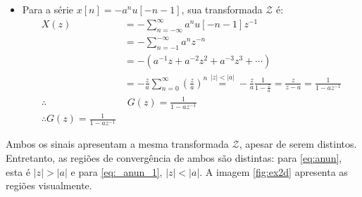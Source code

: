 \begin{enumerate}
\begin{itemize}
                \item Para a série $x[n] = -a^n u[-n-1]$, sua transformada $\mathcal{Z}$ é:
                    \begin{equation}
                        \begin{split}
                            X(z) &= - \sum_{n = - \infty}^{\infty} a^n u[-n - 1] z^{-1} \\
                            &= - \sum_{n = -1}^{-\infty} a^n z^{-n} \\
                            &= -\left(a^{-1}z + a^{-2} z^2 + a^{-3} z^3 + \cdots\right) \\
                            &= -\frac{z}{a} \sum_{n = 0}^{\infty} (\frac{z}{a})^n \stackrel{|z| < |a|}{=} - \frac{z}{a} \frac{1}{1 - \frac{z}{a}} = \frac{z}{z-a} = \frac{1}{1 - a z^{-1}} \\
                            \therefore & \,\, G(z) = \frac{1}{1 - a z^{-1}} \\
                            \therefore G(z) = \frac{1}{1 - a z^{-1}}
                        \end{split}
                    \label{eq:_anun_1}
                    \end{equation}
            \end{itemize}
        \end{enumerate}
    
    Ambos os sinais apresentam a mesma transformada $\mathcal{Z}$, apesar de serem distintos. Entretanto, as regiões de convergência de ambos são distintas: para \eqref{eq:anun}, esta é  $|z| > |a|$ e para \eqref{eq:_anun_1}, $|z| < |a|$. A imagem \ref{fig:ex2d} apresenta as regiões visualmente.
    
